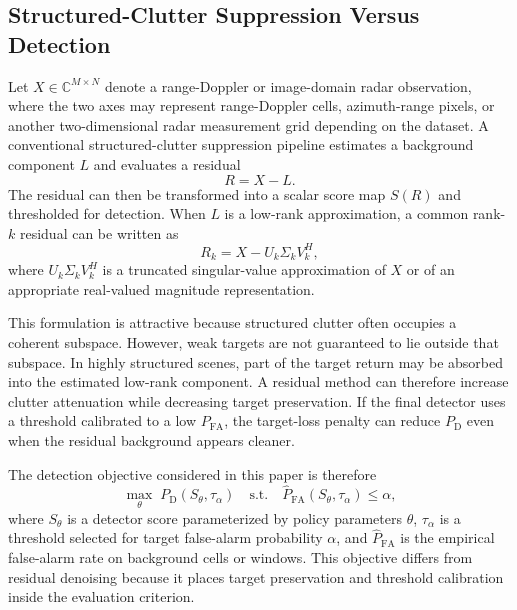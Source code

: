 \documentclass[journal]{IEEEtran}
\begin{document}
\subsection{Structured-Clutter Suppression Versus Detection}

Let $X \in \mathbb{C}^{M \times N}$ denote a range-Doppler or image-domain radar observation, where the two axes may represent range-Doppler cells, azimuth-range pixels, or another two-dimensional radar measurement grid depending on the dataset. A conventional structured-clutter suppression pipeline estimates a background component $L$ and evaluates a residual
\begin{equation}
    R = X - L .
\end{equation}
The residual can then be transformed into a scalar score map $S(R)$ and thresholded for detection. When $L$ is a low-rank approximation, a common rank-$k$ residual can be written as
\begin{equation}
    R_k = X - U_k \Sigma_k V_k^{H},
\end{equation}
where $U_k \Sigma_k V_k^{H}$ is a truncated singular-value approximation of $X$ or of an appropriate real-valued magnitude representation.

This formulation is attractive because structured clutter often occupies a coherent subspace. However, weak targets are not guaranteed to lie outside that subspace. In highly structured scenes, part of the target return may be absorbed into the estimated low-rank component. A residual method can therefore increase clutter attenuation while decreasing target preservation. If the final detector uses a threshold calibrated to a low $P_{\mathrm{FA}}$, the target-loss penalty can reduce $P_{\mathrm{D}}$ even when the residual background appears cleaner.

The detection objective considered in this paper is therefore
\begin{equation}
    \max_{\theta} \; P_{\mathrm{D}}(S_\theta, \tau_\alpha)
    \quad \mathrm{s.t.} \quad
    \widehat{P}_{\mathrm{FA}}(S_\theta, \tau_\alpha) \leq \alpha ,
\end{equation}
where $S_\theta$ is a detector score parameterized by policy parameters $\theta$, $\tau_\alpha$ is a threshold selected for target false-alarm probability $\alpha$, and $\widehat{P}_{\mathrm{FA}}$ is the empirical false-alarm rate on background cells or windows. This objective differs from residual denoising because it places target preservation and threshold calibration inside the evaluation criterion.
\end{document}
